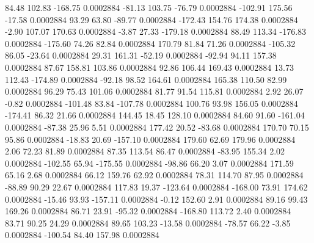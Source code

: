        84.48      102.83     -168.75     0.0002884
      -81.13      103.75      -76.79     0.0002884
     -102.91      175.56      -17.58     0.0002884
       93.29       63.80      -89.77     0.0002884
     -172.43      154.76      174.38     0.0002884
       -2.90      107.07      170.63     0.0002884
       -3.87       27.33     -179.18     0.0002884
       88.49      113.34     -176.83     0.0002884
     -175.60       74.26       82.84     0.0002884
      170.79       81.84       71.26     0.0002884
     -105.32       86.05      -23.64     0.0002884
       29.31      161.31      -52.19     0.0002884
      -92.94       94.11      157.38     0.0002884
       87.67      158.81      103.86     0.0002884
       92.86      106.44      169.43     0.0002884
       13.73      112.43     -174.89     0.0002884
      -92.18       98.52      164.61     0.0002884
      165.38      110.50       82.99     0.0002884
       96.29       75.43      101.06     0.0002884
       81.77       91.54      115.81     0.0002884
        2.92       26.07       -0.82     0.0002884
     -101.48       83.84     -107.78     0.0002884
      100.76       93.98      156.05     0.0002884
     -174.41       86.32       21.66     0.0002884
      144.45       18.45      128.10     0.0002884
       84.60       91.60     -161.04     0.0002884
      -87.38       25.96        5.51     0.0002884
      177.42       20.52      -83.68     0.0002884
      170.70       70.15       95.86     0.0002884
      -18.83       20.69     -157.10     0.0002884
      179.60       62.69      179.96     0.0002884
        2.06       72.23       81.89     0.0002884
       87.35      113.54       86.47     0.0002884
      -83.95      155.34        2.02     0.0002884
     -102.55       65.94     -175.55     0.0002884
      -98.86       66.20        3.07     0.0002884
      171.59       65.16        2.68     0.0002884
       66.12      159.76       62.92     0.0002884
       78.31      114.70       87.95     0.0002884
      -88.89       90.29       22.67     0.0002884
      117.83       19.37     -123.64     0.0002884
     -168.00       73.91      174.62     0.0002884
      -15.46       93.93     -157.11     0.0002884
       -0.12      152.60        2.91     0.0002884
       89.16       99.43      169.26     0.0002884
       86.71       23.91      -95.32     0.0002884
     -168.80      113.72        2.40     0.0002884
       83.71       90.25       24.29     0.0002884
       89.65      103.23      -13.58     0.0002884
      -78.57       66.22       -3.85     0.0002884
     -100.54       84.40      157.98     0.0002884
